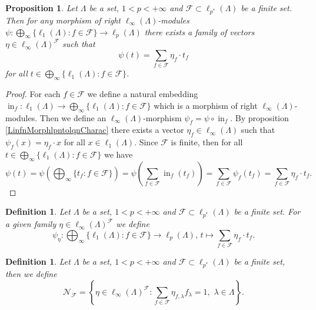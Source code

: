 \documentclass[12pt]{article}
\newtheorem{proposition}[theorem]{Proposition}
\newtheorem{definition}[theorem]{Definition}
\begin{document}
\begin{proposition}\label{ExtMorphSuml1ntlpnCharac}
    Let $\Lambda$ be a set, $1<p<+\infty$ 
    and $\mathcal{F}\subset \ell_{p^*}(\Lambda)$ be a finite set. Then for any 
    morphism of right $\ell_\infty(\Lambda)$-modules
    $\psi:\bigoplus_\infty\{\ell_1(\Lambda):f\in\mathcal{F}\}\to\ell_p(\Lambda)$ 
    there exists a family of vectors $\eta\in\ell_\infty(\Lambda)^\mathcal{F}$ 
    such that
    \[
        \psi(t)=\sum_{f\in\mathcal{F}} \eta_f \cdot t_f
    \]
    for all $t\in \bigoplus_\infty\{ \ell_1(\Lambda):f\in\mathcal{F}\}$.
\end{proposition}
\begin{proof}
    For each $f\in\mathcal{F}$  we define a natural embedding
    $
        \operatorname{in}_f:
        \ell_1(\Lambda)\to\bigoplus_\infty\{\ell_1(\Lambda):f\in\mathcal{F}\}
    $
    which is a morphism of right $\ell_\infty(\Lambda)$-modules. Then we define 
    an $\ell_\infty(\Lambda)$-morphism $\psi_f=\psi\circ \operatorname{in}_f$. 
    By proposition \ref{LinfnMorphlpntolqnCharac} there exists 
    a vector $\eta_f\in\ell_\infty(\Lambda)$ such that $\psi_f(x)=\eta_f\cdot x$ 
    for all $x\in\ell_1(\Lambda)$. Since $\mathcal{F}$ is finite, then for 
    all $t\in \bigoplus_\infty\{ \ell_1(\Lambda) : f\in \mathcal{F}\}$ we have
    \[
        \psi(t)
        =\psi\left(\bigoplus_\infty\{ t_f : f\in\mathcal{F}\}\right)
        =\psi\left(\sum_{f\in\mathcal{F}} \operatorname{in}_f(t_f)\right)
        =\sum_{f\in\mathcal{F}}\psi_f(t_f)
        =\sum_{f\in\mathcal{F}} \eta_f\cdot t_f.
    \]
\end{proof}

\begin{definition}\label{ParamExtMorph}
    Let $\Lambda$ be a set, $1<p<+\infty$ 
    and $\mathcal{F}\subset \ell_{p^*}(\Lambda)$ be
    a finite set. For a given family $\eta\in \ell_\infty(\Lambda)^\mathcal{F}$
    we define
    \[
        \psi_{\eta}:
        \bigoplus_\infty\{\ell_1(\Lambda):f\in\mathcal{F}\}\to\ell_p(\Lambda),\,
        t\mapsto\sum_{f\in\mathcal{F}} \eta_f\cdot t_f.
    \]
\end{definition}

\begin{definition}\label{ExtMorphs}
    Let $\Lambda$ be a set, $1<p<+\infty$ 
    and $\mathcal{F}\subset\ell_{p^*}(\Lambda)$ be a finite set, then we define
    \[
        \mathcal{N}_{\mathcal{F}}=\left\{
            \eta\in \ell_\infty(\Lambda)^{\mathcal{F}} : 
            \sum_{f\in\mathcal{F}} \eta_{f,\lambda}f_\lambda=1,\,\,
            \lambda\in\Lambda
        \right\}.
    \]
\end{definition}
\end{document}
